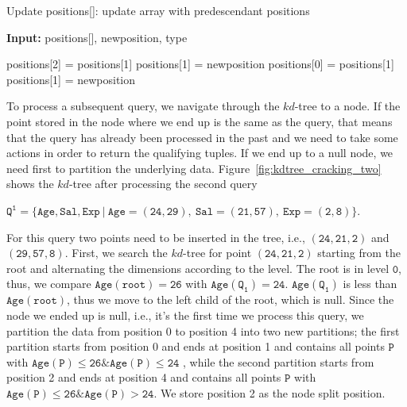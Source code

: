 \begin{algorithm}[t] 
\caption{Update positions[]: update array with predescendant positions}
\textbf{Input: } positions[], newposition, type

\label{alg:updatePositions}
\begin{algorithmic}[1]
\STATE positions[2] = positions[1]
\STATE positions[1] = newposition
\ELSE
\STATE positions[0] = positions[1]
\STATE positions[1] = newposition
\ENDIF
\end{algorithmic}
\end{algorithm}

To process a subsequent query, we navigate through the $kd$-tree to a node.
If the point stored in the node where we end up is the same as the query, 
that means that the query has already been processed in the past and we need to take some actions in order to return the qualifying tuples. 
If we end up to a null node, we need first to partition the underlying data.
Figure~\ref{fig:kdtree_cracking_two} shows the $kd$-tree after processing the second query
\begin{center}
$\mathtt{Q^1 = \{Age,Sal,Exp\ |\ Age = (24,29),\ Sal = (21,57),\ Exp = (2,8)\}}$.
\end{center}
For this query two points need to be inserted in the tree, i.e., $\mathtt{(24,21,2)}$ and $\mathtt{(29,57,8)}$.
First, we search the $kd$-tree for point $\mathtt{(24,21,2)}$ starting from the root and alternating the dimensions according to the level.
The root is in level $\mathtt{0}$, thus, we compare $\mathtt{Age(root)=26}$ with $\mathtt{Age(Q_1)=24}$.
$\mathtt{Age(Q_1)}$ is less than $\mathtt{Age(root)}$, thus we move to the left child of the root, which is null.
Since the node we ended up is null, i.e., it's the first time we process this query, we partition the data from position 0 to position 4 into two new partitions; the first partition starts from position 0 and ends at position 1 and contains all points $\mathtt{P}$ with $\mathtt{Age(P) \leq 26 \& Age(P) \leq 24}$ , while the second partition starts from position 2 and ends at position 4 and contains all points $\mathtt{P}$ with $\mathtt{Age(P) \leq 26 \& Age(P) > 24}$.
We store position 2 as the node split position.

